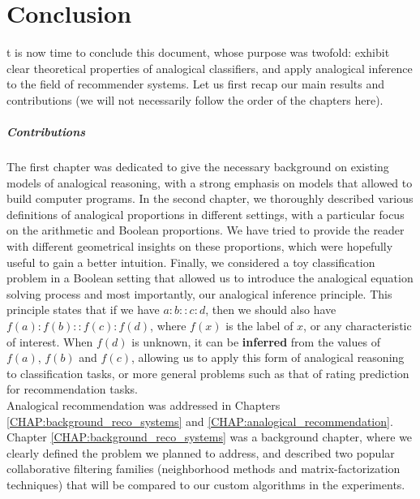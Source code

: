 \chapter*{Conclusion}

t is now time to conclude this document, whose purpose was twofold:
exhibit clear theoretical properties of analogical classifiers, and apply
analogical inference to the field of recommender systems. Let us first recap
our main results and contributions (we will not necessarily follow the order of
the chapters here).

\paragraph{Contributions\\}

The first chapter was dedicated to give the necessary background on existing
models of analogical reasoning,  with a strong emphasis on models that allowed
to build computer programs. In the second chapter, we thoroughly described
various definitions of analogical proportions in different settings, with a
particular focus on the arithmetic and Boolean proportions. We have tried to
provide the reader with different geometrical insights on these proportions,
which were hopefully useful to gain a better intuition.
Finally, we considered a toy classification problem in a Boolean setting that
allowed us to introduce the analogical equation solving process and most
importantly, our analogical inference principle. This principle states that if
we have $a:b::c:d$, then we should also have $f(a) : f(b) :: f(c):f(d)$, where
$f(x)$ is the label of $x$, or any characteristic of interest.  When $f(d)$ is
unknown, it can be \textbf{inferred} from the values of $f(a)$, $f(b)$ and
$f(c)$, allowing us to apply this form of analogical reasoning to
classification tasks, or more general problems such as that of rating
prediction for recommendation tasks.\\

Analogical recommendation was addressed in Chapters
\ref{CHAP:background_reco_systems} and \ref{CHAP:analogical_recommendation}.
Chapter \ref{CHAP:background_reco_systems} was a background chapter, where we
clearly defined the problem we planned to address, and described two popular
collaborative filtering families (neighborhood methods and
matrix-factorization techniques) that will be compared to our custom algorithms
in the experiments.

